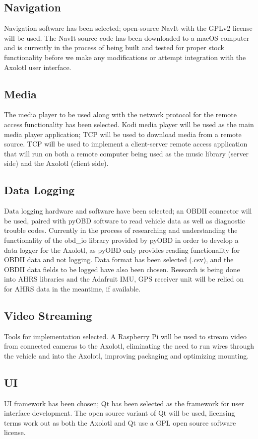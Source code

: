 \documentclass[onecolumn, draftclsnofoot,10pt, compsoc]{IEEEtran}
\begin{document}
\subsection{Navigation}
Navigation software has been selected; open-source NavIt with the GPLv2 license will be used. The NavIt source code has been downloaded to a macOS computer and is currently in the process of being built and tested for proper stock functionality before we make any modifications or attempt integration with the Axolotl user interface.

\subsection{Media}
The media player to be used along with the network protocol for the remote access functionality has been selected. Kodi media player will be used as the main media player application; TCP will be used to download media from a remote source. TCP will be used to implement a client-server remote access application that will run on both a remote computer being used as the music library (server side) and the Axolotl (client side).

\subsection{Data Logging}
Data logging hardware and software have been selected; an OBDII connector will be used, paired with pyOBD software to read vehicle data as well as diagnostic trouble codes. Currently in the process of researching and understanding the functionality of the obd\_io library provided by pyOBD in order to develop a data logger for the Axolotl, as pyOBD only provides reading functionality for OBDII data and not logging. Data format has been selected (.csv), and the OBDII data fields to be logged have also been chosen. Research is being done into AHRS libraries and the Adafruit IMU, GPS receiver unit will be relied on for AHRS data in the meantime, if available.

\subsection{Video Streaming}
Tools for implementation selected. A Raspberry Pi will be used to stream video from connected cameras to the Axolotl, eliminating the need to run wires through the vehicle and into the Axolotl, improving packaging and optimizing mounting.

\subsection{UI}
UI framework has been chosen; Qt has been selected as the framework for user interface development. The open source variant of Qt will be used, licensing terms work out as both the Axolotl and Qt use a GPL open source software license.
\end{document}
